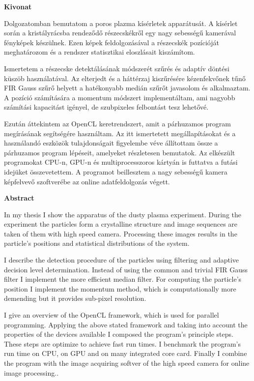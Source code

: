 \begin{center}
	\huge
	\textbf{Kivonat}
\end{center}


	Dolgozatomban bemutatom a poros plazma kísérletek apparátusát.
	A kísérlet során a kristályrácsba rendeződő részecskékről egy nagy sebességű kamerával fényképek készülnek.
	Ezen képek feldolgozásával a részecskék pozícióját meghatározom és a rendszer statisztikai eloszlásait kiszámítom.
	
	Ismertetem a részecske detektálásának módszerét szűrés és adaptív döntési küszöb használatával.
	Az elterjedt és a háttérzaj kiszűrésére kézenfekvőnek tűnő FIR Gauss szűrő helyett a hatékonyabb medián szűrőt javasolom és alkalmaztam.
	A pozíció számítására a momentum módszert implementáltam, ami nagyobb számítási kapacitást igényel, de szubpixeles felbontást tesz lehetővé.
	
	Ezután áttekintem az OpenCL keretrendszert, amit a párhuzamos program megírásának segítségére használtam.
	Az itt ismertetett megállapításokat és a használandó eszközök tulajdonságait figyelembe véve állítottam össze a párhuzamos program lépéseit, amelyeket részletesen bemutatok.
	Az elkészült programokat CPU-n, GPU-n és multiprocesszoros kártyán is futtatva a futási idejüket összevetettem.
	A programot beillesztem a nagy sebességű kamera képfelvevő szoftverébe az online adatfeldolgozás végett.

\newpage


\begin{center}
	\huge
	\textbf{Abstract}
\end{center}

	In my thesis I show the apparatus of the dusty plasma experiment.
	During the experiment the particles form a crystalline structure
        and image sequences are taken of them with high speed camera.
	Processing these images results in the particle's positions
        and statistical distributions of the system.
	
	I describe the detection procedure of the particles using
        filtering and adaptive decision level determination.
	Instead of using the common and trivial FIR Gauss filter I implement the more efficient median filter.
	For computing the particle's position I implement the momentum
        method, which is computationally more demending but it provides sub-pixel resolution.
	
	I give an overview of the OpenCL framework, which is used for parallel programming.
	Applying the above stated framework and taking into account
        the properties of the devices available I composed the
        program's principle steps.
	These steps are optimize to achieve fast run times.
	I benchmark the program's run time on CPU, on GPU and on many integrated core card.
	Finally I combine the program with the image acquiring
        softver of the high speed camera for online image processing..
	
